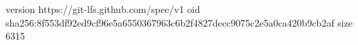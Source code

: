 version https://git-lfs.github.com/spec/v1
oid sha256:8f553df92ed9cf96e5a6550367963c6b2f4827decc9075c2e5a0ca420b9cb2af
size 6315
